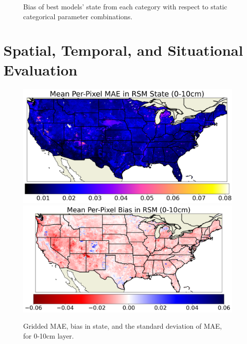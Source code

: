 \begin{figure}[hp!]

    \caption{Bias of best models' state from each category with respect to static categorical parameter combinations.}
    \label{best-static-bias}
\end{figure}

\section{Spatial, Temporal, and Situational Evaluation}

\begin{figure}[hp!]
    \centering

    \includegraphics[width=.48\linewidth,draft=false]{figures/grid-eval_lstm-rsm-9_full/eval-grid_full_lstm-rsm-9_rsm-10_spatial-stats_abs-err_state-err-abs-mean.png}
    \includegraphics[width=.48\linewidth,draft=false]{figures/grid-eval_lstm-rsm-9_full/eval-grid_full_lstm-rsm-9_rsm-10_spatial-stats_bias_state-err-bias-mean.png}


    \caption{Gridded MAE, bias in state, and the standard deviation of MAE, for 0-10cm layer.}
    \label{lstm-rsm-9-grid-rsm-10}
\end{figure}

